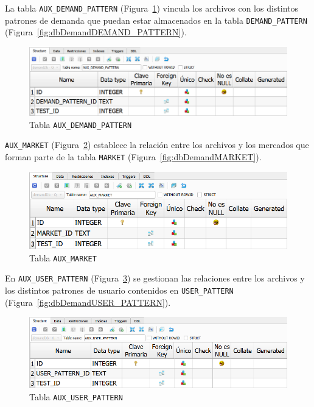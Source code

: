 La tabla \texttt{AUX\_DEMAND\_PATTERN} (Figura~\ref{fig:dbDemandAUX_DEMAND_PATTERN}) vincula los archivos con los distintos patrones de demanda que puedan estar almacenados en la tabla \texttt{DEMAND\_PATTERN} (Figura~\ref{fig:dbDemandDEMAND_PATTERN}). 

\begin{figure}[H]
\centering
\includegraphics[width=.9\textwidth]{fig/Tablas base de datos/Demanda/AUX_DEMAND_PATTERN.png}
\caption{Tabla \texttt{AUX\_DEMAND\_PATTERN}}
\label{fig:dbDemandAUX_DEMAND_PATTERN}
\end{figure}

\texttt{AUX\_MARKET} (Figura~\ref{fig:dbDemandAUX_MARKET}) establece la relación entre los archivos y los mercados que forman parte de la tabla \texttt{MARKET} (Figura~\ref{fig:dbDemandMARKET}).

\begin{figure}[H]
\centering
\includegraphics[width=.9\textwidth]{fig/Tablas base de datos/Demanda/AUX_MARKET.png}
\caption{Tabla \texttt{AUX\_MARKET}}
\label{fig:dbDemandAUX_MARKET}
\end{figure}

En \texttt{AUX\_USER\_PATTERN} (Figura~\ref{fig:dbDemandAUX_USER_PATTERN}) se gestionan las relaciones entre los archivos y los distintos patrones de usuario contenidos en \texttt{USER\_PATTERN} (Figura~\ref{fig:dbDemandUSER_PATTERN}). 

\begin{figure}[H]
\centering
\includegraphics[width=.9\textwidth]{fig/Tablas base de datos/Demanda/AUX_USER_PATTERN.png}
\caption{Tabla \texttt{AUX\_USER\_PATTERN}}
\label{fig:dbDemandAUX_USER_PATTERN}
\end{figure}

